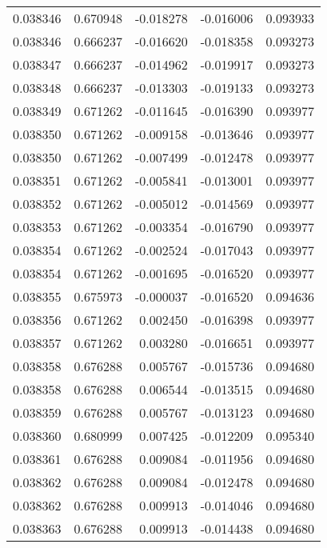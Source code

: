 \begin{tabular}{lrrrr}
0.038346    &  0.670948 & -0.018278 & -0.016006 &             0.093933 \\
0.038346    &  0.666237 & -0.016620 & -0.018358 &             0.093273 \\
0.038347    &  0.666237 & -0.014962 & -0.019917 &             0.093273 \\
0.038348    &  0.666237 & -0.013303 & -0.019133 &             0.093273 \\
0.038349    &  0.671262 & -0.011645 & -0.016390 &             0.093977 \\
0.038350    &  0.671262 & -0.009158 & -0.013646 &             0.093977 \\
0.038350    &  0.671262 & -0.007499 & -0.012478 &             0.093977 \\
0.038351    &  0.671262 & -0.005841 & -0.013001 &             0.093977 \\
0.038352    &  0.671262 & -0.005012 & -0.014569 &             0.093977 \\
0.038353    &  0.671262 & -0.003354 & -0.016790 &             0.093977 \\
0.038354    &  0.671262 & -0.002524 & -0.017043 &             0.093977 \\
0.038354    &  0.671262 & -0.001695 & -0.016520 &             0.093977 \\
0.038355    &  0.675973 & -0.000037 & -0.016520 &             0.094636 \\
0.038356    &  0.671262 &  0.002450 & -0.016398 &             0.093977 \\
0.038357    &  0.671262 &  0.003280 & -0.016651 &             0.093977 \\
0.038358    &  0.676288 &  0.005767 & -0.015736 &             0.094680 \\
0.038358    &  0.676288 &  0.006544 & -0.013515 &             0.094680 \\
0.038359    &  0.676288 &  0.005767 & -0.013123 &             0.094680 \\
0.038360    &  0.680999 &  0.007425 & -0.012209 &             0.095340 \\
0.038361    &  0.676288 &  0.009084 & -0.011956 &             0.094680 \\
0.038362    &  0.676288 &  0.009084 & -0.012478 &             0.094680 \\
0.038362    &  0.676288 &  0.009913 & -0.014046 &             0.094680 \\
0.038363    &  0.676288 &  0.009913 & -0.014438 &             0.094680 \\

\end{tabular}
